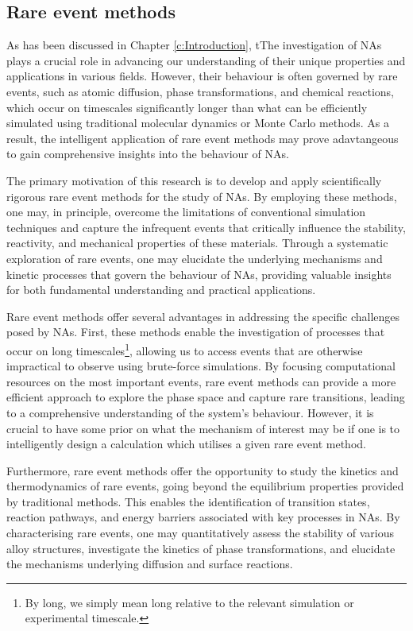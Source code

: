 \subsection{Rare event methods}
\label{sec:rare_events}

As has been discussed in Chapter \ref{c:Introduction}, tThe investigation of NAs plays a crucial role in advancing our understanding of their unique properties and applications in various fields. However, their behaviour is often governed by rare events, such as atomic diffusion, phase transformations, and chemical reactions, which occur on timescales significantly longer than what can be efficiently simulated using traditional molecular dynamics or Monte Carlo methods. As a result, the intelligent application of rare event methods may prove adavtangeous to gain comprehensive insights into the behaviour of NAs.

The primary motivation of this research is to develop and apply scientifically rigorous rare event methods for the study of NAs. By employing these methods, one may, in principle, overcome the limitations of conventional simulation techniques and capture the infrequent events that critically influence the stability, reactivity, and mechanical properties of these materials. Through a systematic exploration of rare events, one may elucidate the underlying mechanisms and kinetic processes that govern the behaviour of NAs, providing valuable insights for both fundamental understanding and practical applications.

Rare event methods offer several advantages in addressing the specific challenges posed by NAs. First, these methods enable the investigation of processes that occur on long timescales\footnote[2]{By long, we simply mean long relative to the relevant simulation or experimental timescale.}, allowing us to access events that are otherwise impractical to observe using brute-force simulations. By focusing computational resources on the most important events, rare event methods can provide a more efficient approach to explore the phase space and capture rare transitions, leading to a comprehensive understanding of the system's behaviour. However, it is crucial to have some prior on what the mechanism of interest may be if one is to intelligently design a calculation which utilises a given rare event method.

Furthermore, rare event methods offer the opportunity to study the kinetics and thermodynamics of rare events, going beyond the equilibrium properties provided by traditional methods. This enables the identification of transition states, reaction pathways, and energy barriers associated with key processes in NAs. By characterising rare events, one may quantitatively assess the stability of various alloy structures, investigate the kinetics of phase transformations, and elucidate the mechanisms underlying diffusion and surface reactions.

